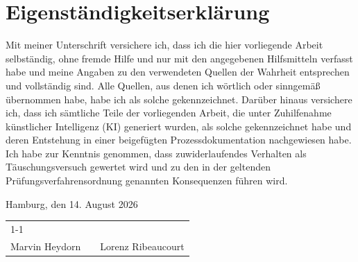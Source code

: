 \clearpage
\section{Eigenständigkeitserklärung}
Mit meiner Unterschrift versichere ich, dass ich die hier vorliegende Arbeit selbständig, ohne
fremde Hilfe und nur mit den angegebenen Hilfsmitteln verfasst habe und meine Angaben zu
den verwendeten Quellen der Wahrheit entsprechen und vollständig sind. Alle Quellen, aus
denen ich wörtlich oder sinngemäß übernommen habe, habe ich als solche gekennzeichnet.
Darüber hinaus versichere ich, dass ich sämtliche Teile der vorliegenden Arbeit, die unter
Zuhilfenahme künstlicher Intelligenz (KI) generiert wurden, als solche gekennzeichnet habe und
deren Entstehung in einer beigefügten Prozessdokumentation nachgewiesen habe.
Ich habe zur Kenntnis genommen, dass zuwiderlaufendes Verhalten als Täuschungsversuch
gewertet wird und zu den in der geltenden Prüfungsverfahrensordnung genannten
Konsequenzen führen wird.


Hamburg, den 14. August 2026

\vspace{2cm}

\noindent
\begin{tabular}{p{6.5cm} p{0.8cm} p{6.5cm}}
\cline{1-1} \cline{3-3} \\[-0.5em]
Marvin Heydorn & & Lorenz Ribeaucourt \\
\end{tabular}

